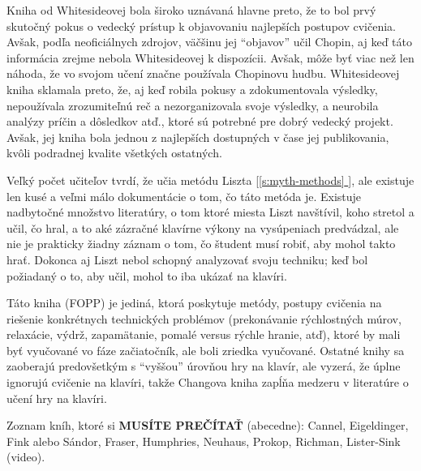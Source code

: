 \documentclass[11pt,a4paper]{book}
\newcommand*{\fullref}[1]{\hyperref[{#1}]{\ref*{#1} \nameref*{#1}}} %
\newcommand*{\fullrefp}[1]{[\fullref{#1}]} %
\begin{document}
Kniha od Whitesideovej bola široko uznávaná hlavne preto, že to bol prvý skutočný pokus o vedecký prístup k objavovaniu najlepších postupov cvičenia. Avšak, podľa neoficiálnych zdrojov, väčšinu jej “objavov” učil Chopin, aj keď táto informácia zrejme nebola Whitesideovej k dispozícii. Avšak, môže byť viac než len náhoda, že vo svojom učení značne používala Chopinovu hudbu. Whitesideovej kniha sklamala preto, že, aj keď robila pokusy a zdokumentovala výsledky, nepoužívala zrozumiteľnú reč a nezorganizovala svoje výsledky, a neurobila analýzy príčin a dôsledkov atď., ktoré sú potrebné pre dobrý vedecký projekt. Avšak, jej kniha bola jednou z najlepších dostupných v čase jej publikovania, kvôli podradnej kvalite všetkých ostatných. 

Veľký počet učiteľov tvrdí, že učia metódu Liszta \fullrefp{s:myth-methods}, ale existuje len kusé a veľmi málo dokumentácie o tom, čo táto metóda je. Existuje nadbytočné množstvo literatúry, o tom ktoré miesta Liszt navštívil, koho stretol a učil, čo hral, a to aké zázračné klavírne výkony na vysúpeniach predvádzal, ale nie je prakticky žiadny záznam o tom, čo študent musí robiť, aby mohol takto hrať. Dokonca aj Liszt nebol schopný analyzovať svoju techniku; keď bol požiadaný o to, aby učil, mohol to iba ukázať na klavíri. 

Táto kniha (FOPP) je jediná, ktorá poskytuje metódy, postupy cvičenia na riešenie konkrétnych technických problémov (prekonávanie rýchlostných múrov, relaxácie, výdrž, zapamätanie, pomalé versus rýchle hranie, atď), ktoré by mali byť vyučované vo fáze začiatočník, ale boli zriedka vyučované. Ostatné knihy sa zaoberajú predovšetkým s “vyššou” úrovňou hry na klavír, ale vyzerá, že úplne ignorujú cvičenie na klavíri, takže Changova kniha zapĺňa medzeru v literatúre o učení hry na klavíri. 


Zoznam kníh, ktoré si \textbf{MUSÍTE PREČÍTAŤ} (abecedne): Cannel, Eigeldinger, Fink alebo Sándor, Fraser, Humphries, Neuhaus, Prokop, Richman, Lister-Sink (video).
\end{document}
